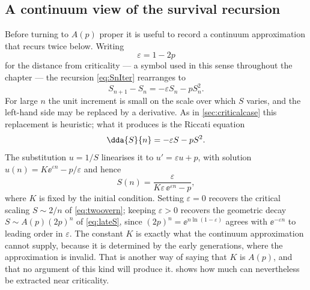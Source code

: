 \subsection{A continuum view of the survival recursion}
\label{sec:riccati}

Before turning to $A(p)$ proper it is useful to record a continuum approximation
that recurs twice below. Writing
\begin{equation}
\label{eq:epsdef}
\varepsilon = 1-2p
\end{equation}
for the distance from criticality --- a symbol used in this sense throughout the
chapter --- the recursion \cref{eq:SnIter} rearranges to
\begin{equation}
\label{eq:Sdiff}
S_{n+1}-S_n = -\varepsilon S_n - pS_n^2 .
\end{equation}
For large $n$ the unit increment is small on the scale over which $S$ varies, and
the left-hand side may be replaced by a derivative. As in \cref{sec:criticalcase}
this replacement is heuristic; what it produces is the Riccati equation
\begin{equation}
\label{eq:riccati}
\dda{S}{n} = -\varepsilon S - pS^2 .
\end{equation}
The substitution $u=1/S$ linearises it to $u' = \varepsilon u + p$, with solution
$u(n) = K\ee^{\varepsilon n}-p/\varepsilon$ and hence
\begin{equation}
\label{eq:riccatisol}
S(n) = \frac{\varepsilon}{K\varepsilon\,\ee^{\varepsilon n}-p},
\end{equation}
where $K$ is fixed by the initial condition. Setting $\varepsilon=0$ recovers the
critical scaling $S\sim2/n$ of \cref{eq:twoovern}; keeping $\varepsilon>0$ recovers
the geometric decay $S\sim A(p)(2p)^n$ of \cref{eq:lateS}, since
$(2p)^n = \ee^{n\ln(1-\varepsilon)}$ agrees with $\ee^{-\varepsilon n}$ to leading
order in $\varepsilon$. The
constant $K$ is exactly what the continuum approximation cannot supply, because it
is determined by the early generations, where the approximation is invalid. That is
another way of saying that $K$ is $A(p)$, and that no argument of this kind will
produce it.  shows how much can nevertheless be extracted near
criticality.

\FloatBarrier
